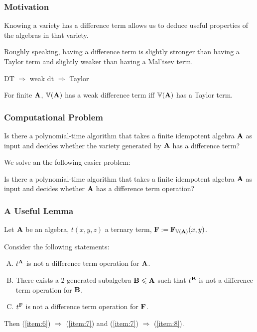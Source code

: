 \documentclass[12pt,xcolor=dvipsnames%
   ]{beamer}
\begin{document}
\begin{frame}
  \frametitle{Motivation}
  Knowing a variety has a difference term allows us to deduce useful
  properties of the algebras in that variety.

  Roughly speaking, having a difference term is slightly stronger than having
  a Taylor term and slightly weaker than having a Mal'tsev term.

  DT $\Rightarrow$ weak dt $\Rightarrow$  Taylor
  
  For finite $\mathbf{A}$, $\operatorname{\mathbb{V}}(\mathbf{A})$ has a weak difference term iff
  $\operatorname{\mathbb{V}}(\mathbf{A})$ has a  Taylor term.
\end{frame}

\begin{frame}
  \frametitle{Computational Problem}
  \begin{problem}[1]
  \label{prob:1}
  Is there a polynomial-time algorithm that takes a finite
  idempotent algebra $\mathbf{A}$ as input and decides whether the variety generated by
  $\mathbf{A}$ has a difference term?
\end{problem}

We solve an the following easier problem:
\begin{problem}[2]
  \label{prob:2}
  Is there a polynomial-time algorithm that takes a finite
  idempotent algebra $\mathbf{A}$ as input and decides whether 
  $\mathbf{A}$ has a difference term operation?
\end{problem}
\end{frame}

\begin{frame}
  \frametitle{A Useful Lemma}
  
\begin{lemma}
  \label{lem:equiv-cond-exist-1}
  Let $\mathbf{A}$ be an algebra, $t(x,y,z)$ a ternary term,
  $\mathbf{F} := \mathbf{F}_{\operatorname{\mathbb{V}}(\mathbf{A})}(x,y)$. 

  Consider the following statements:
  \begin{enumerate}[(A)]
  \item \label{item:6} $t^{\mathbf{A}}$ is not a difference term operation for $\mathbf{A}$.
  \item \label{item:7} There exists a 2-generated subalgebra $\mathbf{B} \leqslant \mathbf{A}$
    such that $t^{\mathbf{B}}$ is not a difference term operation for $\mathbf{B}$.
  \item \label{item:8} $t^{\mathbf{F}}$ is not a difference term operation for $\mathbf{F}$.
  \end{enumerate}
  Then (\ref{item:6}) $\Rightarrow$ (\ref{item:7}) and (\ref{item:7})  $\Rightarrow$ (\ref{item:8}).
\end{lemma}
\end{frame}
\end{document}
